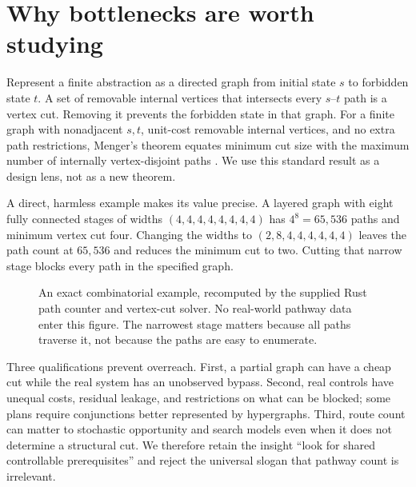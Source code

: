 \section{Why bottlenecks are worth studying}
\label{sec:graphs}

Represent a finite abstraction as a directed graph from initial state $s$ to forbidden state $t$. A set of removable internal vertices that intersects every $s$--$t$ path is a vertex cut. Removing it prevents the forbidden state in that graph. For a finite graph with nonadjacent $s,t$, unit-cost removable internal vertices, and no extra path restrictions, Menger's theorem equates minimum cut size with the maximum number of internally vertex-disjoint paths \cite{menger}. We use this standard result as a design lens, not as a new theorem.

A direct, harmless example makes its value precise. A layered graph with eight fully connected stages of widths $(4,4,4,4,4,4,4,4)$ has $4^8=65{,}536$ paths and minimum vertex cut four. Changing the widths to $(2,8,4,4,4,4,4,4)$ leaves the path count at $65{,}536$ and reduces the minimum cut to two. Cutting that narrow stage blocks every path in the specified graph.

\begin{figure}[t]
\centering
{}
\caption{An exact combinatorial example, recomputed by the supplied Rust path counter and vertex-cut solver. No real-world pathway data enter this figure. The narrowest stage matters because all paths traverse it, not because the paths are easy to enumerate.}
\label{fig:cuts}
\end{figure}

Three qualifications prevent overreach. First, a partial graph can have a cheap cut while the real system has an unobserved bypass. Second, real controls have unequal costs, residual leakage, and restrictions on what can be blocked; some plans require conjunctions better represented by hypergraphs. Third, route count can matter to stochastic opportunity and search models even when it does not determine a structural cut. We therefore retain the insight ``look for shared controllable prerequisites'' and reject the universal slogan that pathway count is irrelevant.

